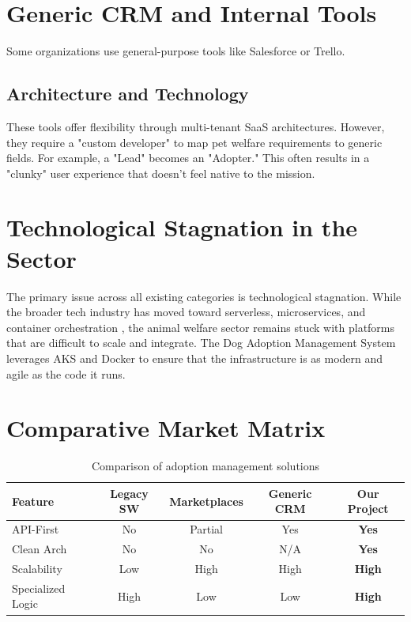 \section{Generic CRM and Internal Tools}

Some organizations use general-purpose tools like Salesforce or Trello.

\subsection{Architecture and Technology}
These tools offer flexibility through multi-tenant SaaS architectures. However, they require a "custom developer" to map pet welfare requirements to generic fields. For example, a "Lead" becomes an "Adopter." This often results in a "clunky" user experience that doesn't feel native to the mission.

\section{Technological Stagnation in the Sector}
The primary issue across all existing categories is technological stagnation. While the broader tech industry has moved toward serverless, microservices, and container orchestration \cite{microservices_fowler}, the animal welfare sector remains stuck with platforms that are difficult to scale and integrate. The Dog Adoption Management System leverages AKS and Docker to ensure that the infrastructure is as modern and agile as the code it runs.

\section{Comparative Market Matrix}
\begin{table}[h!]
    \centering
    \begin{tabular}{|l|c|c|c|c|}
    \hline
    \textbf{Feature} & \textbf{Legacy SW} & \textbf{Marketplaces} & \textbf{Generic CRM} & \textbf{Our Project} \\
    \hline
    API-First & No & Partial & Yes & \textbf{Yes} \\
    Clean Arch & No & No & N/A & \textbf{Yes} \\
    Scalability & Low & High & High & \textbf{High} \\
    Specialized Logic & High & Low & Low & \textbf{High} \\
    \hline
    \end{tabular}
    \caption{Comparison of adoption management solutions}
\end{table}
